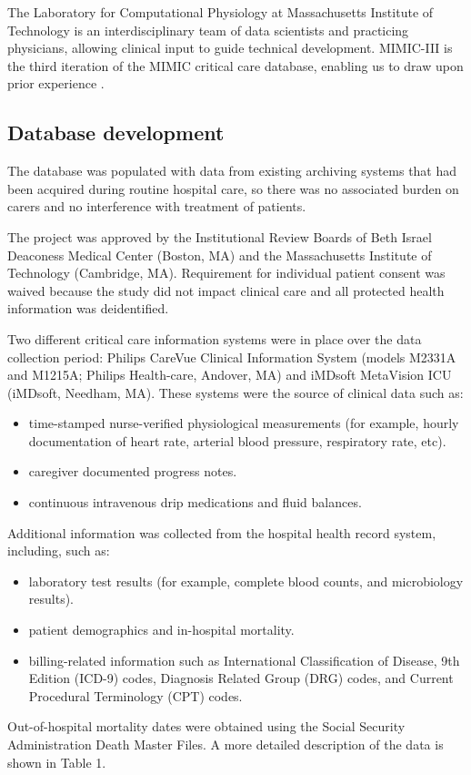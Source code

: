 \documentclass[english]{article}
\begin{document}

The Laboratory for Computational Physiology at Massachusetts Institute of Technology is an interdisciplinary team of data scientists and practicing physicians, allowing clinical input to guide technical development. MIMIC-III is the third iteration of the MIMIC critical care database, enabling us to draw upon prior experience \cite{cite3}. 

\subsection*{Database development}

The database was populated with data from existing archiving systems that had been acquired during routine hospital care, so there was no associated burden on carers and no interference with treatment of patients. 

The project was approved by the Institutional Review Boards of Beth Israel Deaconess Medical Center (Boston, MA) and the Massachusetts Institute of Technology (Cambridge, MA). Requirement for individual patient consent was waived because the study did not impact clinical care and all protected health information was deidentified.

Two different critical care information systems were in place over the data collection period: Philips CareVue Clinical Information System (models M2331A and M1215A; Philips Health-care, Andover, MA) and iMDsoft MetaVision ICU (iMDsoft, Needham, MA). These systems were the source of clinical data such as: 
\begin{itemize}
  \item time-stamped nurse-verified physiological measurements (for example, hourly documentation of heart rate, arterial blood pressure, respiratory rate, etc).
  \item caregiver documented progress notes.
  \item continuous intravenous drip medications and fluid balances.
\end{itemize}

Additional information was collected from the hospital health record system, including, such as:
\begin{itemize}
  \item laboratory test results (for example, complete blood counts, and microbiology results).
  \item patient demographics and in-hospital mortality.
  \item billing-related information such as International Classification of Disease, 9th Edition (ICD-9) codes, Diagnosis Related Group (DRG) codes, and Current Procedural Terminology (CPT) codes.
\end{itemize}
Out-of-hospital mortality dates were obtained using the Social Security Administration Death Master Files. A more detailed description of the data is shown in Table 1. 
\end{document}
